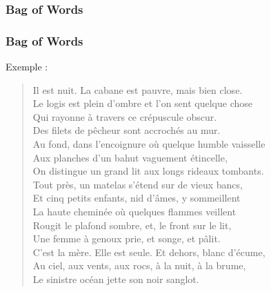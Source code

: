 \begin{frame}
\end{frame}

\begin{frame}
  \frametitle{Bag of Words}
\end{frame}

\begin{frame}[t]
  \frametitle{Bag of Words}
  \vspace{1cm}
  Exemple :

  \begin{quote}
    Il est nuit. La cabane est pauvre, mais bien close.\\
    Le logis est plein d'ombre et l'on sent quelque chose\\
    Qui rayonne à travers ce crépuscule obscur.\\
    Des filets de pêcheur sont accrochés au mur.\\
    Au fond, dans l'encoignure où quelque humble vaisselle\\
    Aux planches d'un bahut vaguement étincelle,\\
    On distingue un grand lit aux longs rideaux tombants.\\
    Tout près, un matelas s'étend sur de vieux bancs,\\
    Et cinq petits enfants, nid d'âmes, y sommeillent\\
    La haute cheminée où quelques flammes veillent\\
    Rougit le plafond sombre, et, le front sur le lit,\\
    Une femme à genoux prie, et songe, et pâlit.\\
    C'est la mère. Elle est seule. Et dehors, blanc d'écume,\\
    Au ciel, aux vents, aux rocs, à la nuit, à la brume,\\
    Le sinistre océan jette son noir sanglot.
  \end{quote}
\end{frame}

